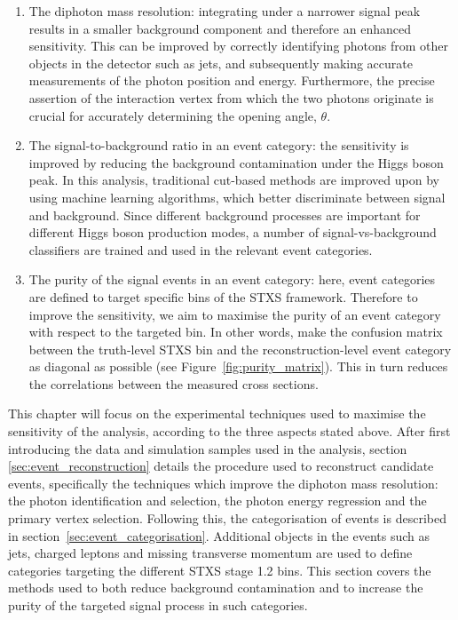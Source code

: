 \begin{enumerate}
    \item The diphoton mass resolution: integrating under a narrower signal peak results in a smaller background component and therefore an enhanced sensitivity. This can be improved by correctly identifying photons from other objects in the detector such as jets, and subsequently making accurate measurements of the photon position and energy. Furthermore, the precise assertion of the interaction vertex from which the two photons originate is crucial for accurately determining the opening angle, $\theta$.
    
    \item The signal-to-background ratio in an event category: the sensitivity is improved by reducing the background contamination under the Higgs boson peak. In this analysis, traditional cut-based methods are improved upon by using machine learning algorithms, which better discriminate between signal and background. Since different background processes are important for different Higgs boson production modes, a number of signal-vs-background classifiers are trained and used in the relevant event categories.
    
    \item The purity of the signal events in an event category: here, event categories are defined to target specific bins of the STXS framework. Therefore to improve the sensitivity, we aim to maximise the purity of an event category with respect to the targeted bin. In other words, make the confusion matrix between the truth-level STXS bin and the reconstruction-level event category as diagonal as possible (see Figure~\ref{fig:purity_matrix}). This in turn reduces the correlations between the measured cross sections.
\end{enumerate}

This chapter will focus on the experimental techniques used to maximise the sensitivity of the analysis, according to the three aspects stated above. After first introducing the data and simulation samples used in the analysis, section \ref{sec:event_reconstruction} details the procedure used to reconstruct candidate \Hgg events, specifically the techniques which improve the diphoton mass resolution: the photon identification and selection, the photon energy regression and the primary vertex selection. Following this, the categorisation of events is described in section~\ref{sec:event_categorisation}. Additional objects in the events such as jets, charged leptons and missing transverse momentum are used to define categories targeting the different STXS stage 1.2 bins. This section covers the methods used to both reduce background contamination and to increase the purity of the targeted signal process in such categories.







